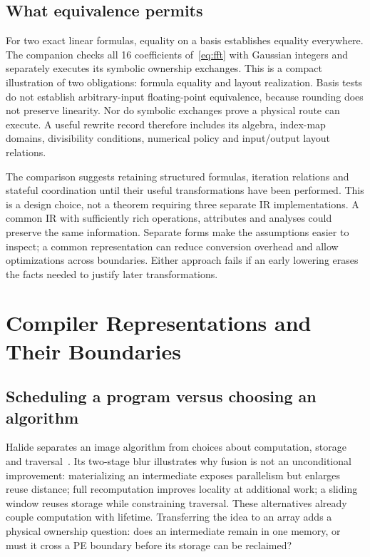 \documentclass[final,3p,times,authoryear]{elsarticle}
\begin{document}
\subsection{What equivalence permits}
For two exact linear formulas, equality on a basis establishes equality everywhere. The companion checks all 16 coefficients of~\eqref{eq:fft} with Gaussian integers and separately executes its symbolic ownership exchanges. This is a compact illustration of two obligations: formula equality and layout realization. Basis tests do not establish arbitrary-input floating-point equivalence, because rounding does not preserve linearity. Nor do symbolic exchanges prove a physical route can execute. A useful rewrite record therefore includes its algebra, index-map domains, divisibility conditions, numerical policy and input/output layout relations.

The comparison suggests retaining structured formulas, iteration relations and stateful coordination until their useful transformations have been performed. This is a design choice, not a theorem requiring three separate IR implementations. A common IR with sufficiently rich operations, attributes and analyses could preserve the same information. Separate forms make the assumptions easier to inspect; a common representation can reduce conversion overhead and allow optimizations across boundaries. Either approach fails if an early lowering erases the facts needed to justify later transformations.


\section{Compiler Representations and Their Boundaries}\label{sec:compilers}
\subsection{Scheduling a program versus choosing an algorithm}
Halide separates an image algorithm from choices about computation, storage and traversal~\citep{ragankelley2013}. Its two-stage blur illustrates why fusion is not an unconditional improvement: materializing an intermediate exposes parallelism but enlarges reuse distance; full recomputation improves locality at additional work; a sliding window reuses storage while constraining traversal. These alternatives already couple computation with lifetime. Transferring the idea to an array adds a physical ownership question: does an intermediate remain in one memory, or must it cross a PE boundary before its storage can be reclaimed?
\end{document}
